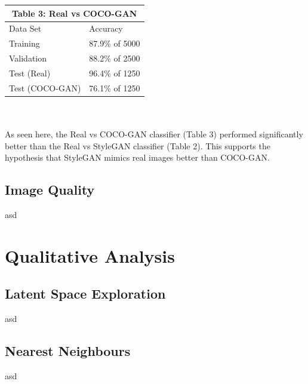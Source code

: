 \documentclass[12pt]{article}
\begin{document}
\begin{multicols*}{2}
        \begin{tabular}{ |p{4cm}|p{3cm}|  }
             \hline
             \multicolumn{2}{|c|}{Table 3: Real vs COCO-GAN} \\
             \hline
            Data Set     & Accuracy\\
             \hline
            Training        & 87.9\% of 5000 \\
             \hline
            Validation      & 88.2\% of 2500 \\
             \hline
            Test (Real)     & 96.4\% of 1250 \\
             \hline
            Test (COCO-GAN) & 76.1\% of 1250 \\
             \hline
        \end{tabular}
        \\\\
        As seen here, the Real vs COCO-GAN classifier (Table 3) performed significantly better than the Real vs StyleGAN classifier (Table 2).
        This supports the hypothesis that StyleGAN mimics real images better than COCO-GAN.
        \subsection{Image Quality}
        \label{subsec:imageQuality}
        asd


        \section{Qualitative Analysis}
        \label{sec:qualitative}
        \subsection{Latent Space Exploration}
        \label{subsec:latentSpaceExploration}
        asd
        \subsection{Nearest Neighbours}
        \label{subsec:nearestneighbours}
        asd
    \end{multicols*}
    \newpage
\end{document}
